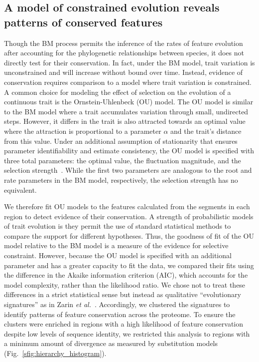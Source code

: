 \subsection{A model of constrained evolution reveals patterns of conserved features}
Though the BM process permits the inference of the rates of feature evolution after accounting for the phylogenetic relationships between species, it does not directly test for their conservation. In fact, under the BM model, trait variation is unconstrained and will increase without bound over time. Instead, evidence of conservation requires comparison to a model where trait variation is constrained. A common choice for modeling the effect of selection on the evolution of a continuous trait is the Ornstein-Uhlenbeck (OU) model. The OU model is similar to the BM model where a trait accumulates variation through small, undirected steps. However, it differs in the trait is also attracted towards an optimal value where the attraction is proportional to a parameter $\alpha$ and the trait's distance from this value. Under an additional assumption of stationarity that ensures parameter identifiability and estimate consistency, the OU model is specified with three total parameters: the optimal value, the fluctuation magnitude, and the selection strength~\cite{Ho2013, Ho2014}. While the first two parameters are analogous to the root and rate parameters in the BM model, respectively, the selection strength has no equivalent.

We therefore fit OU models to the features calculated from the segments in each region to detect evidence of their conservation. A strength of probabilistic models of trait evolution is they permit the use of standard statistical methods to compare the support for different hypotheses. Thus, the goodness of fit of the OU model relative to the BM model is a measure of the evidence for selective constraint. However, because the OU model is specified with an additional parameter and has a greater capacity to fit the data, we compared their fits using the difference in the Akaike information criterion (AIC), which accounts for the model complexity, rather than the likelihood ratio. We chose not to treat these differences in a strict statistical sense but instead as qualitative ``evolutionary signatures'' as in Zarin \textit{et al.}~\cite{Zarin2019}. Accordingly, we clustered the signatures to identify patterns of feature conservation across the proteome. To ensure the clusters were enriched in regions with a high likelihood of feature conservation despite low levels of sequence identity, we restricted this analysis to regions with a minimum amount of divergence as measured by substitution models (Fig.~\ref{sfig:hierarchy_histogram}).

